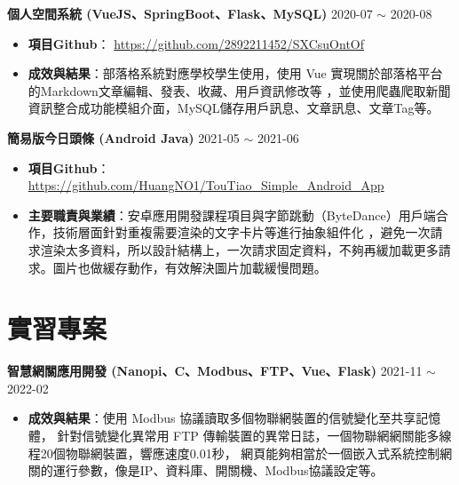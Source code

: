 \documentclass[classical]{einfart}
\begin{document}
\newline

\textbf{個人空間系統 (VueJS、SpringBoot、Flask、MySQL)} \hfill 2020-07 $\sim$ 2020-08

\begin{itemize}[parsep=0.5ex]
\item \textbf{項目Github}： \href{https://github.com/2892211452/SXCsuOntOf}{https://github.com/2892211452/SXCsuOntOf}

\item \textbf{成效與結果}：部落格系統對應學校學生使用，使用 Vue 實現關於部落格平台的Markdown文章編輯、發表、收藏、用戶資訊修改等
，並使用爬蟲爬取新聞資訊整合成功能模組介面，MySQL儲存用戶訊息、文章訊息、文章Tag等。

\end{itemize}

\newline

\textbf{簡易版今日頭條 (Android Java)} \hfill 2021-05 $\sim$ 2021-06


\begin{itemize}[parsep=0.5ex]
\item \textbf{項目Github}： \href{https://github.com/HuangNO1/TouTiao_Simple_Android_App}{https://github.com/HuangNO1/TouTiao\_Simple\_Android\_App}

\item \textbf{主要職責與業績}：安卓應用開發課程項目與字節跳動（ByteDance）用戶端合作，技術層面針對重複需要渲染的文字卡片等進行抽象組件化
，避免一次請求渲染太多資料，所以設計結構上，一次請求固定資料，不夠再緩加載更多請求。圖片也做緩存動作，有效解決圖片加載緩慢問題。

\end{itemize}

\section{實習專案}

\textbf{智慧網關應用開發 (Nanopi、C、Modbus、FTP、Vue、Flask)} \hfill 2021-11 $\sim$ 2022-02

\begin{itemize}[parsep=0.5ex]
\item \textbf{成效與結果}：使用 Modbus 協議讀取多個物聯網裝置的信號變化至共享記憶體，
針對信號變化異常用 FTP 傳輸裝置的異常日誌，一個物聯網網關能多線程20個物聯網裝置，響應速度0.01秒，
網頁能夠相當於一個嵌入式系統控制網關的運行參數，像是IP、資料庫、開關機、Modbus協議設定等。

\end{itemize}
\end{document}
